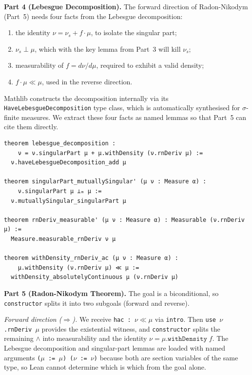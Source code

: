 \documentclass[11pt]{article}
\begin{document}
\medskip
\noindent
\textbf{Part 4 (Lebesgue Decomposition).}
The forward direction of Radon-Nikodym (Part~5) needs four facts from the Lebesgue decomposition:
\begin{enumerate}
\item[(i)] the identity $\nu = \nu_s + f\cdot\mu$, to isolate the singular part;
\item[(ii)] $\nu_s \perp \mu$, which with the key lemma from Part~3 will kill $\nu_s$;
\item[(iii)] measurability of $f = d\nu/d\mu$, required to exhibit a valid density;
\item[(iv)] $f\cdot\mu \ll \mu$, used in the reverse direction.
\end{enumerate}
Mathlib constructs the decomposition internally via its \texttt{HaveLebesgueDecomposition} type class, which is automatically synthesised for $\sigma$-finite measures. We extract these four facts as named lemmas so that Part~5 can cite them directly.

\begin{verbatim}
theorem lebesgue_decomposition :
    ν = ν.singularPart μ + μ.withDensity (ν.rnDeriv μ) :=
  ν.haveLebesgueDecomposition_add μ

theorem singularPart_mutuallySingular' (μ ν : Measure α) :
    ν.singularPart μ ⟂ₘ μ :=
  ν.mutuallySingular_singularPart μ

theorem rnDeriv_measurable' (μ ν : Measure α) : Measurable (ν.rnDeriv μ) :=
  Measure.measurable_rnDeriv ν μ

theorem withDensity_rnDeriv_ac (μ ν : Measure α) :
    μ.withDensity (ν.rnDeriv μ) ≪ μ :=
  withDensity_absolutelyContinuous μ (ν.rnDeriv μ)
\end{verbatim}

\medskip
\noindent
\textbf{Part 5 (Radon-Nikodym Theorem).}
The goal is a biconditional, so \texttt{constructor} splits it into two subgoals (forward and reverse).

\emph{Forward direction ($\Rightarrow$).} We receive \texttt{hac~:~$\nu \ll \mu$} via \texttt{intro}. Then \texttt{use~$\nu$.rnDeriv~$\mu$} provides the existential witness, and \texttt{constructor} splits the remaining $\wedge$ into measurability and the identity $\nu = \mu.\texttt{withDensity}\;f$. The Lebesgue decomposition and singular-part lemmas are loaded with named arguments \texttt{($\mu$ := $\mu$)~($\nu$ := $\nu$)} because both are section variables of the same type, so Lean cannot determine which is which from the goal alone.
\end{document}
